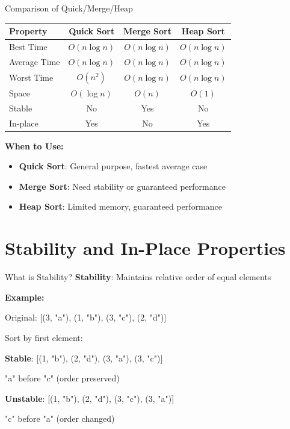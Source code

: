 \documentclass[aspectratio=169]{beamer}
\begin{document}
\begin{frame}{Comparison of Quick/Merge/Heap}
  \begin{center}
  \begin{tabular}{|l|c|c|c|}
    \hline
    \textbf{Property} & \textbf{Quick Sort} & \textbf{Merge Sort} & \textbf{Heap Sort} \\
    \hline
    Best Time & $O(n \log n)$ & $O(n \log n)$ & $O(n \log n)$ \\
    \hline
    Average Time & $O(n \log n)$ & $O(n \log n)$ & $O(n \log n)$ \\
    \hline
    Worst Time & $O(n^2)$ & $O(n \log n)$ & $O(n \log n)$ \\
    \hline
    Space & $O(\log n)$ & $O(n)$ & $O(1)$ \\
    \hline
    Stable & No & Yes & No \\
    \hline
    In-place & Yes & No & Yes \\
    \hline
  \end{tabular}
  \end{center}

  \vspace{0.3cm}
  \textbf{When to Use:}
  \begin{itemize}
    \item \textbf{Quick Sort}: General purpose, fastest average case
    \item \textbf{Merge Sort}: Need stability or guaranteed performance
    \item \textbf{Heap Sort}: Limited memory, guaranteed performance
  \end{itemize}
\end{frame}

\section{Stability and In-Place Properties}

\begin{frame}{What is Stability?}
  \textbf{Stability}: Maintains relative order of equal elements

  \vspace{0.3cm}
  \textbf{Example:}
  \begin{center}
  Original: [(3, "a"), (1, "b"), (3, "c"), (2, "d")]

  \vspace{0.2cm}
  Sort by first element:

  \vspace{0.2cm}
  \textbf{Stable}: [(1, "b"), (2, "d"), (3, "a"), (3, "c")]

  {\color{blue} "a" before "c" (order preserved)}

  \vspace{0.2cm}
  \textbf{Unstable}: [(1, "b"), (2, "d"), (3, "c"), (3, "a")]

  {\color{red} "c" before "a" (order changed)}
  \end{center}
\end{frame}
\end{document}
